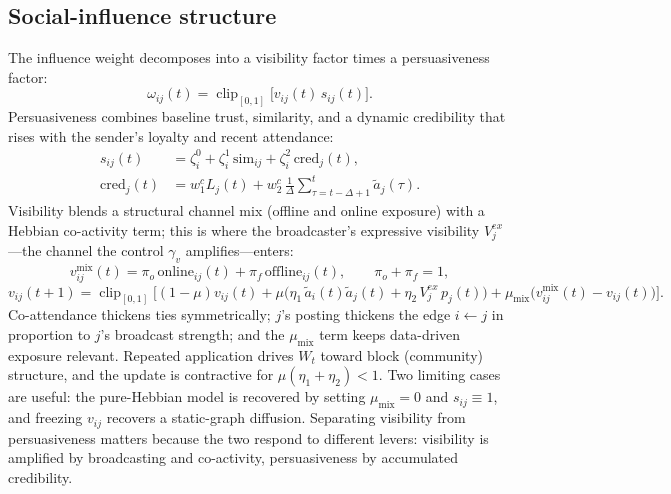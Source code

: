 \documentclass[11pt]{article}
\newcommand{\clip}{\operatorname{clip}_{[0,1]}}
\begin{document}
\subsection{Social-influence structure}\label{sec:influence}
The influence weight decomposes into a visibility factor times a persuasiveness factor:
\begin{equation}\tag{7}\label{eq:omega}
\omega_{ij}(t)=\clip\!\big[v_{ij}(t)\,s_{ij}(t)\big].
\end{equation}
Persuasiveness combines baseline trust, similarity, and a dynamic credibility that rises with the sender's loyalty and recent attendance:
\begin{align}
s_{ij}(t)&=\zeta^0_i+\zeta^1_i\,\mathrm{sim}_{ij}+\zeta^2_i\,\mathrm{cred}_j(t),\tag{9}\label{eq:persuade}\\
\mathrm{cred}_j(t)&=w^{c}_1 L_j(t)+w^{c}_2\,\tfrac1\Delta\!\!\sum_{\tau=t-\Delta+1}^{t}\!\!\tilde a_j(\tau).\tag{10}\label{eq:cred}
\end{align}
Visibility blends a structural channel mix (offline and online exposure) with a Hebbian co-activity term; this is where the broadcaster's expressive visibility $V^{ex}_j$---the channel the control $\gamma_v$ amplifies---enters:
\begin{equation}\tag{8}\label{eq:vmix}
v^{\mathrm{mix}}_{ij}(t)=\pi_o\,\mathrm{online}_{ij}(t)+\pi_f\,\mathrm{offline}_{ij}(t),\qquad \pi_o+\pi_f=1,
\end{equation}
\begin{equation}\tag{11}\label{eq:vupdate}
v_{ij}(t{+}1)=\clip\!\Big[(1-\mu)v_{ij}(t)+\mu\big(\eta_1\,\tilde a_i(t)\tilde a_j(t)+\eta_2\,V^{ex}_j\,p_j(t)\big)+\mu_{\mathrm{mix}}\big(v^{\mathrm{mix}}_{ij}(t)-v_{ij}(t)\big)\Big].
\end{equation}
Co-attendance thickens ties symmetrically; $j$'s posting thickens the edge $i\!\leftarrow\! j$ in proportion to $j$'s broadcast strength; and the $\mu_{\mathrm{mix}}$ term keeps data-driven exposure relevant. Repeated application drives $W_t$ toward block (community) structure, and the update is contractive for $\mu(\eta_1+\eta_2)<1$. Two limiting cases are useful: the pure-Hebbian model is recovered by setting $\mu_{\mathrm{mix}}=0$ and $s_{ij}\equiv1$, and freezing $v_{ij}$ recovers a static-graph diffusion. Separating visibility from persuasiveness matters because the two respond to different levers: visibility is amplified by broadcasting and co-activity, persuasiveness by accumulated credibility.
\end{document}
